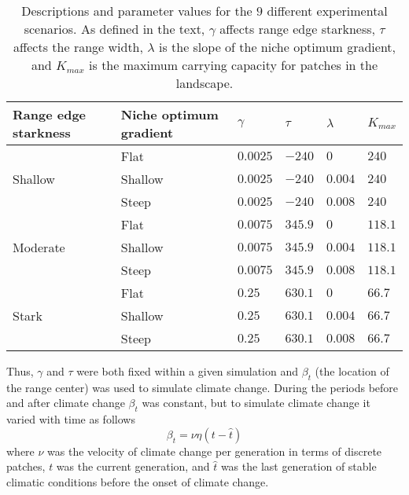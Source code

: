 \documentclass[11pt]{article}
\begin{document}
\begin{table}
\renewcommand{\arraystretch}{1.5}
  \begin{tabular}{ p{4cm} | p{4cm} | p{1.5cm} | p{1.5cm} | p{1.5cm}  | p{1.5cm} }
    \hline
    Range edge starkness & Niche optimum gradient & $\gamma$ & $\tau$ & $\lambda$ & $K_{max}$ \\ \hline \hline
     & Flat & $0.0025$ & $-240$ & $0$ & $240$ \\
    Shallow & Shallow & $0.0025$ & $-240$ & $0.004$ & $240$ \\
     & Steep & $0.0025$ & $-240$ & $0.008$ & $240$ \\ \hline
     & Flat & $0.0075$ & $345.9$ & $0$ & $118.1$ \\
    Moderate & Shallow & $0.0075$ & $345.9$ & $0.004$ & $118.1$ \\
     & Steep & $0.0075$ & $345.9$ & $0.008$ & $118.1$ \\ \hline
     & Flat & $0.25$ & $630.1$ & $0$ & $66.7$ \\
    Stark & Shallow & $0.25$ & $630.1$ & $0.004$ & $66.7$ \\
     & Steep & $0.25$ & $630.1$ & $0.008$ & $66.7$ \\ 
    \hline
  \end{tabular}
\caption[LoF entry]{Descriptions and parameter values for the $9$ different experimental scenarios. As defined in the text, $\gamma$ affects range edge starkness, $\tau$ affects the range width, $\lambda$ is the slope of the niche optimum gradient, and $K_{max}$ is the maximum carrying capacity for patches in the landscape.}
\label{table:Scenarios}
\end{table}

Thus, $\gamma$ and $\tau$ were both fixed within a given simulation and $\beta_{t}$ (the location of the range center) was used to simulate climate change. During the periods before and after climate change $\beta_{t}$ was constant, but to simulate climate change it varied with time as follows
\begin{equation}
\beta_{t}=\nu\eta(t-\hat{t})
\end{equation}
where $\nu$ was the velocity of climate change per generation in terms of discrete patches, $t$ was the current generation, and $\hat{t}$ was the last generation of stable climatic conditions before the onset of climate change.
\end{document}

